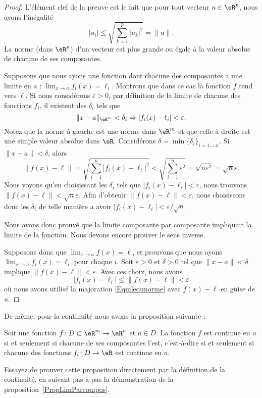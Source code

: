 \begin{proof}
	L'élément clef de la preuve est le fait que pour tout vecteur $u\in\eR^p$, nous ayons l'inégalité
	\begin{equation}	\label{Equilequnorme}
		| u_i |\leq\sqrt{\sum_{k=1}^p| u_k |^2}=\| u \|.
	\end{equation}
	La norme (dans $\eR^p$) d'un vecteur est plus grande ou égale à la valeur absolue de chacune de ses composantes.

	Supposons que nous ayons une fonction dont chacune des composantes a une limite en $a$ : $\lim_{x\to a} f_i(x)=\ell_i$. Montrons que dans ce cas la fonction $f$ tend vers $\ell$. Si nous considérons $\varepsilon>0$, par définition de la limite de chacune des fonctions $f_i$, il  existent des $\delta_i$ tels que
	\begin{equation}
		\| x-a \|_{\eR^m}<\delta_i\Rightarrow | f_i(x)-\ell_i |<\varepsilon.
	\end{equation}
	Notez que la norme à gauche est une norme dans $\eR^m$ et que celle à droite est une simple valeur absolue dans $\eR$. Considérons $\delta=\min\{ \delta_i \}_{i=1,\ldots n}$. Si $\| x-a \|<\delta$, alors
	\begin{equation}
		\| f(x)-\ell \|=\sqrt{\sum_{i=1}^n| f_i(x)-\ell_i |^2}<\sqrt{\sum_{i=1}^n\varepsilon^2}=\sqrt{n\varepsilon^2}=\sqrt{n}\varepsilon.
	\end{equation}
	Nous voyons qu'en choisissant les $\delta_i$ tels que $| f_i(x)-\ell_i |<\varepsilon$, nous trouvons $\| f(x)-\ell \|<\sqrt{n}\varepsilon$. Afin d'obtenir $\| f(x)-\ell \|<\varepsilon$, nous choisissons donc les $\delta_i$ de telle manière a avoir $| f_i(x)-\ell_i |<\varepsilon/\sqrt{n}$.

	Nous avons donc prouvé que la limite composante par composante impliquait la limite de la fonction. Nous devons encore prouver le sens inverse.

	Supposons donc que $\lim_{x\to a} f(x)=\ell$, et prouvons que nous ayons $\lim_{x\to a} f_i(x)=\ell_i$ pour chaque $i$. Soit $\varepsilon>0$ et $\delta>0$ tel que $\| x-a \|<\delta$ implique $\| f(x)-\ell \|<\varepsilon$. Avec ces choix, nous avons
	\begin{equation}
		| f_i(x)-\ell_i |\leq\| f(x)-\ell \|<\varepsilon
	\end{equation}
	où nous avons utilisé la majoration \eqref{Equilequnorme} avec $f(x)-\ell$ en guise de $u$.
\end{proof}

De même, pour la continuité nous avons la proposition suivante :
\begin{proposition}
	Soit une fonction $f\colon D\subset\eR^m\to \eR^n$ et $a\in D$. La fonction $f$ est continue en $a$ si et seulement si chacune de ses composantes l'est, c'est-à-dire si et seulement si chacune des fonctions $f_i\colon D\to \eR$ est continue en $a$.
\end{proposition}
Essayez de prouver cette proposition directement par la définition de la continuité, en suivant pas à pas la démonstration de la proposition~\ref{PropLimParcompos}.


